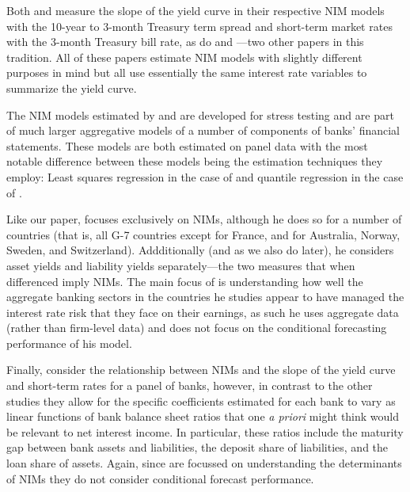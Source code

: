 \documentclass[11pt]{article}
\begin{document}
Both  and  measure the slope of the yield curve in their respective NIM models with the 10-year to 3-month Treasury term spread and short-term market rates with the 3-month Treasury bill rate, as do  and ---two other papers in this tradition.  All of these papers estimate NIM models with slightly different purposes in mind but all use essentially the same interest rate variables to summarize the yield curve.  

The NIM models estimated by  and  are developed for stress testing and are part of much larger aggregative models of a number of components of banks' financial statements. These models are both estimated on panel data with the most notable difference between these models being the estimation techniques they employ: Least squares regression in the case of  and quantile regression in the case of . 

Like our paper,  focuses exclusively on NIMs, although he does so for a number of countries (that is, all G-7 countries except for France, and for Australia, Norway, Sweden, and Switzerland).  Addditionally (and as we also do later), he considers asset yields and liability yields separately---the two measures that when differenced imply NIMs.  The main focus of  is understanding how well the aggregate banking sectors in the countries he studies appear to have managed the interest rate risk that they face on their earnings, as such he uses aggregate data (rather than firm-level data) and does not focus on the conditional forecasting performance of his model.

Finally,  consider the relationship between NIMs and the slope of the yield curve and short-term rates for a panel of banks, however, in contrast to the other studies they allow for the specific coefficients estimated for each bank to vary as linear functions of bank balance sheet ratios that one \textit{a priori} might think would be relevant to net interest income.  In particular, these ratios include the maturity gap between bank assets and liabilities, the deposit share of liabilities, and the loan share of assets. Again, since  are focussed on understanding the determinants of NIMs they do not consider conditional forecast performance.
\end{document}
